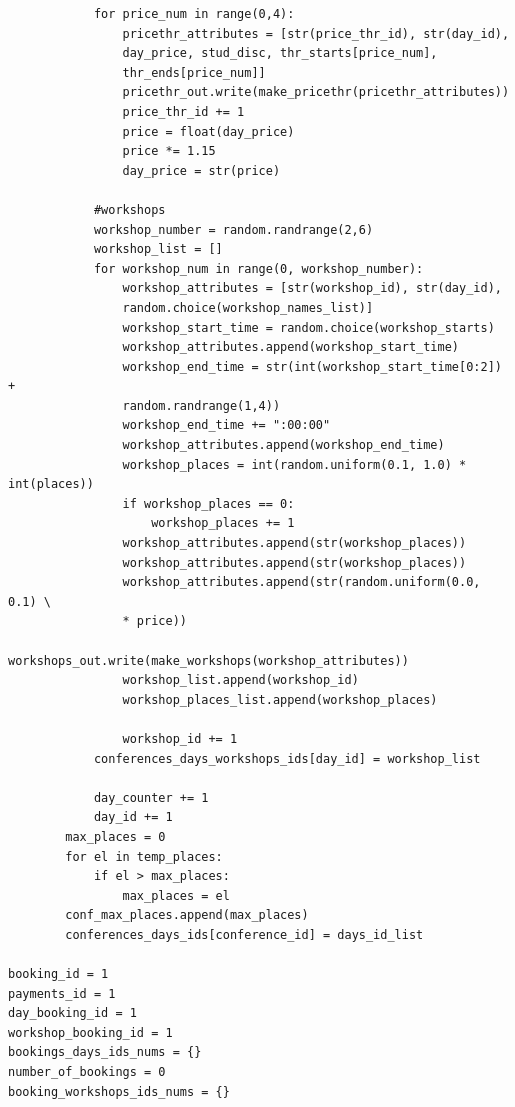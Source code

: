 \documentclass[12pt, a4paper]{mwrep}
\begin{document}
\begin{lstlisting}
            for price_num in range(0,4):            
                pricethr_attributes = [str(price_thr_id), str(day_id), 
                day_price, stud_disc, thr_starts[price_num], 
                thr_ends[price_num]]
                pricethr_out.write(make_pricethr(pricethr_attributes))
                price_thr_id += 1                
                price = float(day_price)
                price *= 1.15
                day_price = str(price)     
        
            #workshops
            workshop_number = random.randrange(2,6)
            workshop_list = []
            for workshop_num in range(0, workshop_number):
                workshop_attributes = [str(workshop_id), str(day_id),
                random.choice(workshop_names_list)]
                workshop_start_time = random.choice(workshop_starts)
                workshop_attributes.append(workshop_start_time)
                workshop_end_time = str(int(workshop_start_time[0:2]) +
                random.randrange(1,4))
                workshop_end_time += ":00:00"
                workshop_attributes.append(workshop_end_time)
                workshop_places = int(random.uniform(0.1, 1.0) * int(places))
                if workshop_places == 0:
                    workshop_places += 1
                workshop_attributes.append(str(workshop_places))
                workshop_attributes.append(str(workshop_places))
                workshop_attributes.append(str(random.uniform(0.0, 0.1) \
                * price))
                workshops_out.write(make_workshops(workshop_attributes))
                workshop_list.append(workshop_id)
                workshop_places_list.append(workshop_places)
            
                workshop_id += 1
            conferences_days_workshops_ids[day_id] = workshop_list
            
            day_counter += 1
            day_id += 1
        max_places = 0
        for el in temp_places:
            if el > max_places:
                max_places = el
        conf_max_places.append(max_places)
        conferences_days_ids[conference_id] = days_id_list

booking_id = 1
payments_id = 1
day_booking_id = 1
workshop_booking_id = 1
bookings_days_ids_nums = {}
number_of_bookings = 0
booking_workshops_ids_nums = {}


\end{lstlisting}
\end{document}

